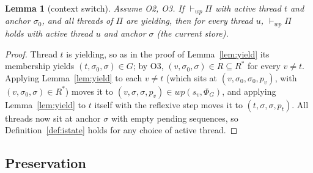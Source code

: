 \documentclass[11pt]{article}
\theoremstyle{plain}
\newtheorem{lemma}{Lemma}
\theoremstyle{plain}
\theoremstyle{definition}
\newcommand{\wpx}{\mathit{wp}}
\newcommand{\vdashwp}{\vdash_{\mathit{wp}}}
\begin{document}
\begin{lemma}[context switch]\label{lem:switch}
Assume O2, O3. If $\vdashwp\Pi$ with active thread $t$ and anchor $\sigma_0$, and
all threads of $\Pi$ are yielding, then for every thread $u$, $\vdashwp\Pi$ holds
with active thread $u$ and anchor $\sigma$ (the current store).
\end{lemma}
\begin{proof}
Thread $t$ is yielding, so as in the proof of Lemma~\ref{lem:yield} its membership
yields $(t,\sigma_0,\sigma)\in G$; by O3, $(v,\sigma_0,\sigma)\in R \subseteq R^*$
for every $v\neq t$. Applying Lemma~\ref{lem:yield} to each $v\neq t$ (which sits
at $(v,\sigma_0,\sigma_0,p_v)$, with $(v,\sigma_0,\sigma)\in R^*$) moves it to
$(v,\sigma,\sigma,p_v)\in\wpx(s_v,\Phi_G)$, and applying Lemma~\ref{lem:yield} to
$t$ itself with the reflexive step moves it to $(t,\sigma,\sigma,p_t)$. All threads
now sit at anchor $\sigma$ with empty pending sequences, so
Definition~\ref{def:istate} holds for any choice of active thread.
\end{proof}

\subsection{Preservation}
\end{document}
